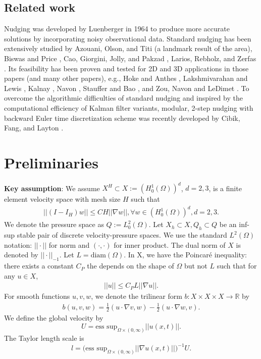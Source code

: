 \documentclass[11pt,a4paper]{article}
\begin{document}
\subsection{Related work}
Nudging was developed by Luenberger \cite{Luenberger:1964} in 1964 to produce more accurate solutions by incorporating noisy observational data. Standard nudging has been extensively studied by Azouani, Olson, and Titi \cite{Azouani:2014} (a landmark result of the area), Biswas and Price \cite{Biswas:2021}, Cao, Giorgini, Jolly, and Pakzad \cite{Cao:2022}, Larios, Rebholz, and Zerfas \cite{Larios:2019}. Its feasibility has been proven and tested for 2D and 3D applications in those papers (and many other papers), e.g., Hoke and Anthes \cite{Hoke:1976}, Lakshmivarahan and Lewis \cite{Lakshmivarahan:2013}, Kalnay \cite{Kalnay:2003}, Navon \cite{Navon:1998}, Stauffer and Bao \cite{Stauffer:1993}, and Zou, Navon and LeDimet \cite{Zou:1992}. To overcome the algorithmic difficulties of standard nudging and inspired by the computational efficiency of Kalman filter variants, modular, 2-step nudging with backward Euler time discretization scheme was recently developed by Cibik, Fang, and Layton \cite{Fang:2025}. 

  
\section{Preliminaries}
 \textbf{Key assumption}: We assume $X^H\subset X:=(H_0^1(\Omega))^d$, $d=2,3$, is a finite element velocity space with mesh size $H$ such that
\begin{align}
    ||(I-I_H)w||\leq CH||\nabla w||, \forall w \in (H_0^1(\Omega))^d, d=2,3.
\end{align}
We denote the pressure space as $Q:=L_0^2(\Omega)$. Let $X_h\subset X, Q_h\subset Q$ be an inf-sup stable pair of discrete velocity-pressure spaces. We use the standard $L^2(\Omega)$ notation: $||\cdot||$ for norm and $(\cdot,\cdot)$ for inner product. The dual norm of $X$ is denoted by $||\cdot ||_{-1}$. Let $L=\text{diam}(\Omega)$. In X, we have the Poincar\'{e} inequality: there exists a constant $C_P$ the depends on the shape of $\Omega$ but not $L$ such that for any $u\in X$,
\begin{align}
    ||u||\leq C_PL ||\nabla u||.
\end{align}
For smooth functions $u,v,w$, we denote the trilinear form $b:X\times X\times X \rightarrow \mathbb{R}$ by
\begin{align}
    b(u,v,w)=\frac{1}{2}(u\cdot \nabla v, w)-\frac{1}{2}(u\cdot \nabla w, v).
\end{align}
We define the global velocity by $$U=\text{ess sup}_{\Omega \times (0,\infty)}||u(x,t)||.$$ The Taylor length scale is $$l=\Big(\text{ess sup}_{\Omega \times (0,\infty)}||\nabla u(x,t)||\Big)^{-1}U.$$
\end{document}
